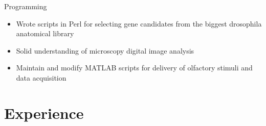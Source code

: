 \documentclass[a4paper]{twentysecondcv} %
\begin{document}
\twentyitem
        [1.0] %
  		{}
		{}
        {Programming}
        {}
        {}
        {
        \begin{itemize}
            \item Wrote scripts in Perl for selecting gene candidates from the biggest drosophila anatomical library
            \item Solid understanding of microscopy digital image analysis
            \item Maintain and modify MATLAB scripts for delivery of olfactory stimuli and data acquisition
        \end{itemize}} 


\section{Experience}
\end{document}
